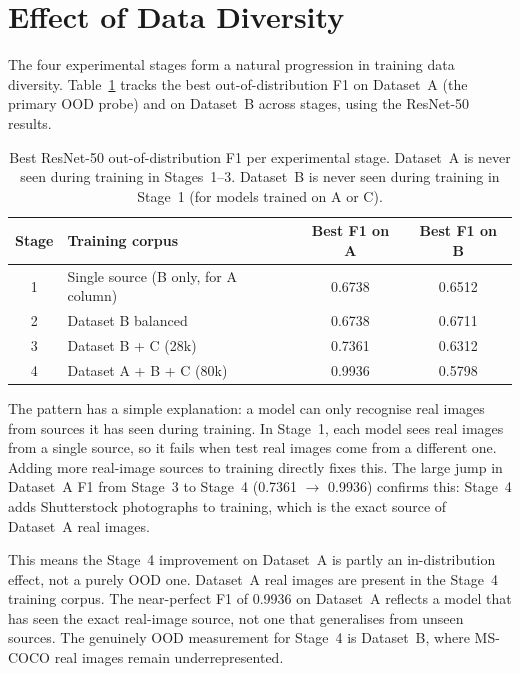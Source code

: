 
\section{Effect of Data Diversity}
\label{sec:data_diversity}

The four experimental stages form a natural progression in training data diversity.
Table~\ref{tab:ood_progression} tracks the best out-of-distribution F1 on Dataset~A
(the primary OOD probe) and on Dataset~B across stages, using the ResNet-50 results.

\begin{table}[h!]
  \centering
  \caption{Best ResNet-50 out-of-distribution F1 per experimental stage. Dataset~A is
           never seen during training in Stages~1--3. Dataset~B is never seen during
           training in Stage~1 (for models trained on A or C).}
  \label{tab:ood_progression}
  \begin{tabular}{clcc}
    \hline
    \textbf{Stage} & \textbf{Training corpus} & \textbf{Best F1 on A} & \textbf{Best F1 on B} \\
    \hline
    1 & Single source (B only, for A column) & 0.6738 & 0.6512 \\
    2 & Dataset B balanced               & 0.6738 & 0.6711 \\
    3 & Dataset B + C (28k)              & 0.7361 & 0.6312 \\
    4 & Dataset A + B + C (80k)          & 0.9936 & 0.5798 \\
    \hline
  \end{tabular}
\end{table}

The pattern has a simple explanation: a model can only recognise real images from sources
it has seen during training. In Stage~1, each model sees real images from a single source,
so it fails when test real images come from a different one. Adding more real-image sources
to training directly fixes this. The large jump in Dataset~A F1 from Stage~3 to Stage~4
(0.7361 $\to$ 0.9936) confirms this: Stage~4 adds Shutterstock photographs to training,
which is the exact source of Dataset~A real images.

This means the Stage~4 improvement on Dataset~A is partly an in-distribution effect, not
a purely OOD one. Dataset~A real images are present in the Stage~4 training corpus. The
near-perfect F1 of 0.9936 on Dataset~A reflects a model that has seen the exact
real-image source, not one that generalises from unseen sources. The genuinely OOD
measurement for Stage~4 is Dataset~B, where MS-COCO real images remain
underrepresented.

